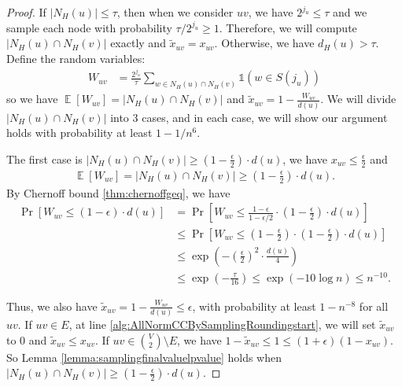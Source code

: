 \documentclass[11pt]{article}
\DeclareMathOperator*{\E}{{\mathbb{E}}}
\begin{document}
\begin{CJK*}{UTF8}{gbsn}
\begin{proof}
If $|N_H(u)| \leq \tau$, then when we consider $uv$, we have $2^{j_u} \leq \tau$ and we sample each node with probability $\tau / 2^{j_u} \geq 1$. Therefore, we will compute $|N_H(u) \cap N_H(v)|$ exactly and $\tilde{x}_{uv} = x_{uv}$. Otherwise, we have $d_H(u) > \tau$. Define the random variables:
\begin{align*}
    W_{uv} &= \frac{2^{j_u}}{\tau}\sum_{w\in N_H(u) \cap N_H(v)}\mathbb{1}(w\in S(j_u))
\end{align*}
so we have $\E[W_{uv}] = |N_H(u) \cap N_H(v)|$ and $\tilde{x}_{uv} = 1 - \frac{W_{uv}}{d(u)}$. We will divide $|N_H(u) \cap N_H(v)|$ into 3 cases, and in each case, we will show our argument holds with probability at least $1 - 1 / n^6$.

The first case is $|N_H(u) \cap N_H(v)| \geq (1 - \frac{\epsilon}{2}) \cdot d(u)$, we have $x_{uv} \leq \frac{\epsilon}{2}$ and 
\begin{align*}
    \E[W_{uv}] = |N_H(u) \cap N_H(v)| \geq (1 - \frac{\epsilon}{2}) \cdot d(u).
\end{align*}
By Chernoff bound \ref{thm:chernoffgeq}, we have 
\begin{align*}
    \Pr[W_{uv} \leq (1 - \epsilon) \cdot d(u)] &= \Pr[W_{uv} \leq \frac{1 - \epsilon}{1 - \epsilon / 2} \cdot (1 - \frac{\epsilon}{2}) \cdot d(u)] \\ 
    &\leq \Pr[W_{uv} \leq (1 - \frac{\epsilon}{2}) \cdot (1 - \frac{\epsilon}{2}) \cdot d(u)] \\
    &\leq \exp \left(- (\frac{\epsilon}{2})^2 \cdot \frac{d(u)}{4} \right) \\
    &\leq \exp \left(- \frac{\tau}{16} \right) \leq \exp(-10\log n) \leq n^{-10}.
\end{align*}

Thus, we also have $\tilde{x}_{uv} = 1 - \frac{W_{uv}}{d(u)} \leq \epsilon$, with probability at least $1 - n^{-8}$ for all $uv$. If $uv \in E$, at line \ref{alg:AllNormCCBySamplingRoundingstart}, we will set $\tilde{x}_{uv}$ to 0 and $\tilde{x}_{uv} \leq x_{uv}$. If $uv \in {V \choose 2} \setminus E$, we have $1 - \tilde{x}_{uv} \leq 1 \leq (1 + \epsilon)(1 - x_{uv})$. So Lemma \ref{lemma:samplingfinalvaluelpvalue} holds when $|N_H(u) \cap N_H(v)| \geq (1 - \frac{\epsilon}{2}) \cdot d(u)$.


\end{proof}
\end{CJK*}
\end{document}
